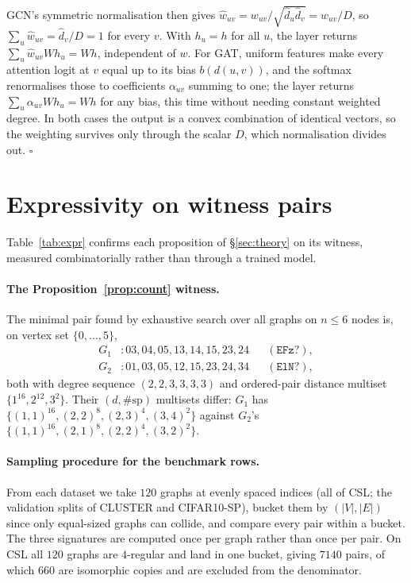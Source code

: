 \documentclass[11pt]{article}
\begin{document}
GCN's symmetric normalisation then gives
$\hat w_{uv}=w_{uv}/\sqrt{\hat d_u\hat d_v}=w_{uv}/D$, so
$\sum_u \hat w_{uv}=\hat d_v/D=1$ for every $v$. With $h_u=h$ for all $u$, the layer returns
$\sum_u \hat w_{uv}Wh_u=Wh$, independent of $w$. For GAT, uniform features make every attention
logit at $v$ equal up to its bias $b(d(u,v))$, and the softmax renormalises those to coefficients
$\alpha_{uv}$ summing to one; the layer returns $\sum_u\alpha_{uv}Wh_u=Wh$ for any bias, this
time without needing constant weighted degree. In both cases the output is a convex combination
of identical vectors, so the weighting survives only through the scalar $D$, which normalisation
divides out. $\square$

\section{Expressivity on witness pairs}
\label{app:expr}
Table~\ref{tab:expr} confirms each proposition of \S\ref{sec:theory} on its witness, measured
combinatorially rather than through a trained model.

\paragraph{The Proposition~\ref{prop:count} witness.} The minimal pair found by exhaustive
search over all graphs on $n\le6$ nodes is, on vertex set $\{0,\dots,5\}$,
\begin{align*}
G_1 &: 03,04,05,13,14,15,23,24 &&(\texttt{EFz?}),\\
G_2 &: 01,03,05,12,15,23,24,34 &&(\texttt{ElN?}),
\end{align*}
both with degree sequence $(2,2,3,3,3,3)$ and ordered-pair distance multiset
$\{1^{16},2^{12},3^{2}\}$. Their $(d,\#\mathrm{sp})$ multisets differ:
$G_1$ has $\{(1,1)^{16},(2,2)^{8},(2,3)^{4},(3,4)^{2}\}$ against
$G_2$'s $\{(1,1)^{16},(2,1)^{8},(2,2)^{4},(3,2)^{2}\}$.

\paragraph{Sampling procedure for the benchmark rows.} From each dataset we take $120$ graphs at
evenly spaced indices (all of CSL; the validation splits of CLUSTER and CIFAR10-SP), bucket them
by $(|V|,|E|)$ since only equal-sized graphs can collide, and compare every pair within a
bucket. The three signatures are computed once per graph rather than once per pair. On CSL all
$120$ graphs are $4$-regular and land in one bucket, giving $7140$ pairs, of which $660$ are
isomorphic copies and are excluded from the denominator.
\end{document}
